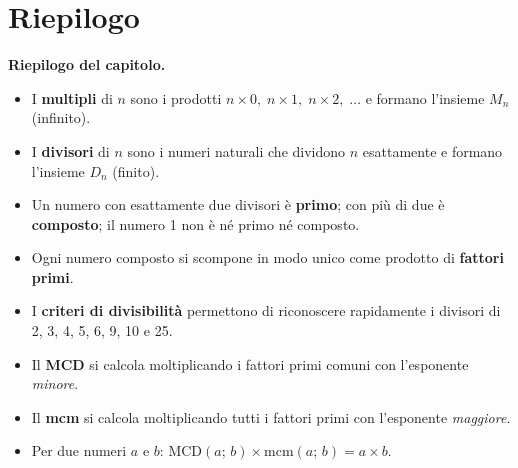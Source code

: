 \section*{Riepilogo}

\begin{regola}
    \textbf{Riepilogo del capitolo.}

    \begin{itemize}[leftmargin=1.5em]
        \item I \textbf{multipli} di $n$ sono i prodotti $n \times 0,\; n \times 1,\;
                  n \times 2,\; \ldots$ e formano l'insieme $M_n$ (infinito).
        \item I \textbf{divisori} di $n$ sono i numeri naturali che dividono $n$
              esattamente e formano l'insieme $D_n$ (finito).
        \item Un numero con esattamente due divisori è \textbf{primo}; con più di
              due è \textbf{composto}; il numero 1 non è né primo né composto.
        \item Ogni numero composto si scompone in modo unico come prodotto di
              \textbf{fattori primi}.
        \item I \textbf{criteri di divisibilità} permettono di riconoscere
              rapidamente i divisori di 2, 3, 4, 5, 6, 9, 10 e 25.
        \item Il \textbf{MCD} si calcola moltiplicando i fattori primi comuni con
              l'esponente \emph{minore}.
        \item Il \textbf{mcm} si calcola moltiplicando tutti i fattori primi con
              l'esponente \emph{maggiore}.
        \item Per due numeri $a$ e $b$: $\text{MCD}(a;\,b) \times \text{mcm}(a;\,b)
                  = a \times b$.
    \end{itemize}
\end{regola}